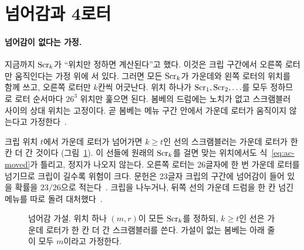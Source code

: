 \section{넘어감과 4로터}\label{sec:ac-turnover}

\paragraph{넘어감이 없다는 가정.} 지금까지 $\mathrm{Scr}_k$가 ``위치만 정하면 계산된다''고 했다. 이것은 크립 구간에서 오른쪽
로터만 움직인다는 가정 위에 서 있다. 그러면 모든 $\mathrm{Scr}_k$가 가운데와 왼쪽 로터의 위치를 함께 쓰고, 오른쪽 로터만
$k$칸씩 어긋난다. 위치 하나가 $\mathrm{Scr}_1, \mathrm{Scr}_2, \ldots$를 모두 정하므로 로터 순서마다 $26^3$ 위치만 훑으면 된다. 봄베의
드럼에는 노치가 없고 스크램블러 사이의 상대 위치는 고정이다. 곧 봄베는 메뉴 구간 안에서 가운데 로터가 움직이지 않는다고
가정한다~\cite[4]{us6812report1944}.

크립 위치 $t$에서 가운데 로터가 넘어가면 $k \geq t$인 선의 스크램블러는 가운데 로터가 한 칸 더 간 것이다
(그림~\ref{fig:ac-turnover}). 이 선들에 원래의 $\mathrm{Scr}_k$를 걸면 맞는 위치에서도 식~\eqref{eq:ac-moved}가 틀리고, 정지가
나오지 않는다. 오른쪽 로터는 26글자에 한 번 가운데 로터를 넘기므로 크립이 길수록 위험이 크다. 문헌은 23글자 크립의
구간에 넘어감이 들어 있을 확률을 $23/26$으로 적는다~\cite{ellsbury1998bombe}. 크립을 나누거나, 뒤쪽 선의 가운데
드럼을 한 칸 넘긴 메뉴를 따로 돌려 대처했다~\cite{ellsbury1998bombe}\cite[37]{us6812report1944}.

\begin{figure}[ht]
\centering
{}
\caption{넘어감 가설. 위치 하나 $(m, r)$이 모든 $\mathrm{Scr}_k$를 정하되, $k \geq t$인 선은 가운데 로터가 한 칸 더 간
스크램블러를 쓴다. 가설이 없는 봄베는 아래 줄이 모두 $m$이라고 가정한다.}
\label{fig:ac-turnover}
\end{figure}

